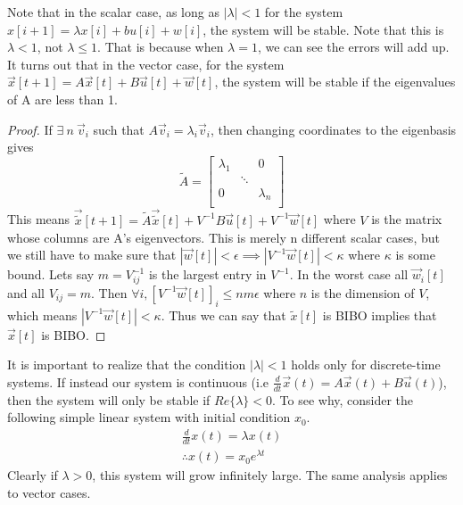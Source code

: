 \documentclass{article}
\newtheorem{proof}{Proof}
\begin{document}
Note that in the scalar case, as long as $|\lambda| < 1$ for the system $x[i+1]=\lambda x[i]+bu[i]+w[i]$, the system will be stable. Note that this is $\lambda<1$, not $\lambda \leq 1$. That is because when $\lambda=1$, we can see the errors will add up.
It turns out that in the vector case, for the system $\vec{x}[t+1]=A \vec{x}[t]+B\vec{u}[t]+\vec{w}[t]$, the system will be stable if the eigenvalues of A are less than 1.
\begin{proof}
    If $\exists \> n \> \vec{v}_i$ such that $A\vec{v}_i=\lambda_i\vec{v}_i$, then changing coordinates to the eigenbasis gives
    $$\tilde{A}=
        \left[
        \begin{array}{ccc}
        \lambda_1 &  & 0 \\
         & \ddots &  \\
        0 &  & \lambda_n \\
        \end{array}
        \right] $$
    This means $\vec{\tilde{x}}[t+1]=\tilde{A}\vec{\tilde{x}}[t]+V^{-1}B\vec{u}[t]+V^{-1}\vec{w}[t]$ where $V$ is the matrix whose columns are A's eigenvectors.
    This is merely n different scalar cases, but we still have to make sure that $|\vec{w}[t]|<\epsilon \implies |V^{-1}\vec{w}[t]|<\kappa$ where $\kappa$ is some bound.
    Lets say $m=V_{ij}^{-1}$ is the largest entry in $V^{-1}$. In the worst case all $\vec{w}_i[t]$ and all $V_{ij}=m$.
    Then $\forall i, \left[V^{-1}\vec{w}[t]\right]_i \leq n m \epsilon$ where $n$ is the dimension of $V$, which means $|V^{-1}\vec{w}[t]|<\kappa$.
    Thus we can say that $\tilde{x}[t]$ is BIBO implies that $\vec{x}[t]$ is BIBO.
\end{proof}
It is important to realize that the condition $|\lambda|<1$ holds only for discrete-time systems. If instead our system is continuous (i.e $\frac{d}{dt}\vec{x}(t)=A\vec{x}(t)+B\vec{u}(t)$),
then the system will only be stable if $Re\{\lambda\}<0$. To see why, consider the following simple linear system with initial condition $x_0$.
\[
    \begin{array}{c}
        \frac{d}{dt}x(t) = \lambda x(t)\\
        \therefore x(t) = x_0 e^{\lambda t}
    \end{array}
\]
Clearly if $\lambda > 0$, this system will grow infinitely large. The same analysis applies to vector cases.
\end{document}
